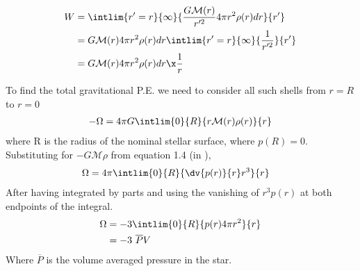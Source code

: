 \documentclass{../template/texnote}
\begin{document}
\begin{align}
    W &=   \intlim{r'=r}{\infty}{\frac{G\mathcal{M}(r)}{r'^2}4\pi r^2\rho(r)dr}{r'} \\
      &=   G\mathcal{M}(r)4\pi r^2\rho(r)dr \intlim{r'=r}{\infty}{\frac{1}{r'^2}}{r'} \\
      &=   G\mathcal{M}(r)4\pi r^2\rho(r)dr \x \frac{1}{r}\\
\end{align}

To find the total gravitational P.E. we need to consider all such shells from $r=R$ to $r=0$
\begin{align}
    -\Omega = 4\pi G \intlim{0}{R}{r\mathcal{M}(r)\rho(r)}{r}
\end{align}
where R is the radius of the nominal stellar surface, where $p(R) = 0$.
Substituting for $-G \mathcal{M}\rho$ from equation 1.4 (in \citeauthor{weinberg_lectures_2020}),
\begin{align}
    \Omega &= 4\pi \intlim{0}{R}{\dv{p(r)}{r}r^3}{r}
\end{align}
After having integrated by parts and using the vanishing of $r^3p(r)$ at both endpoints of the integral.
\begin{align}
    \Omega &= -3 \intlim{0}{R}{p(r)4\pi r^2}{r} \\
           &= -3 \ \overline{P} V
\end{align}
Where $\overline{P}$ is the volume averaged pressure in the star.

    \printbibliography
\end{document}
